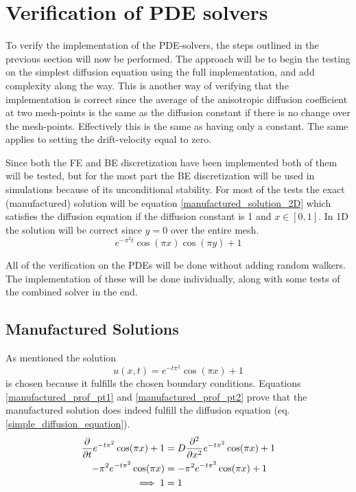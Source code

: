 \section{Verification of PDE solvers}
To verify the implementation of the PDE-solvers, the steps outlined in the previous section will now be performed. 
The approach will be to begin the testing on the simplest diffusion equation using the full implementation, and add complexity along the way. 
This is another way of verifying that the implementation is correct since the average of the anisotropic diffusion coefficient at two mesh-points is the same as the diffusion constant if there is no change over the mesh-points. Effectively this is the same as having only a constant. 
The same applies to setting the drift-velocity equal to zero. 

Since both the FE and BE discretization have been implemented both of them will be tested, but for the most part the BE discretization will be used in simulations because of its unconditional stability.
For most of the tests the exact (manufactured) solution will be equation \eqref{manufactured_solution_2D} which satisfies the diffusion equation if the diffusion constant is 1 and $x\in[0,1]$. 
In 1D the solution will be correct since $y=0$ over the entire mesh. 
\begin{equation}\label{manufactured_solution_2D}
 e^{-\pi^2t}\cos(\pi x)\cos(\pi y) +1
\end{equation}


All of the verification on the PDEs will be done without adding random walkers. The implementation of these will be done individually, along with some tests of the combined solver in the end.

\subsection{Manufactured Solutions}

As mentioned the solution
\begin{equation}\label{manifactured_solution_1D}
 u(x,t) = e^{-t\pi^2}\cos(\pi x) +1
\end{equation}
is chosen because it fulfills the chosen boundary conditions.
Equations \eqref{manufactured_prof_pt1} and \eqref{manufactured_prof_pt2} prove that the manufactured solution does indeed fulfill the diffusion equation (eq. \ref{simple_diffusion_equation}).
\begin{align}
 \frac{\partial }{\partial t}e^{-t\pi^2}\cos(\pi x) +1 &= D\frac{\partial^2}{\partial x^2}e^{-t\pi^2}\cos(\pi x) +1\label{manufactured_prof_pt1}\\
 -\pi^2e^{-t\pi^2}\cos(\pi x) &= -\pi^2e^{-t\pi^2}\cos(\pi x) +1 \label{manufactured_prof_pt2}\\
 \implies 1 &= 1 \nonumber
\end{align}

